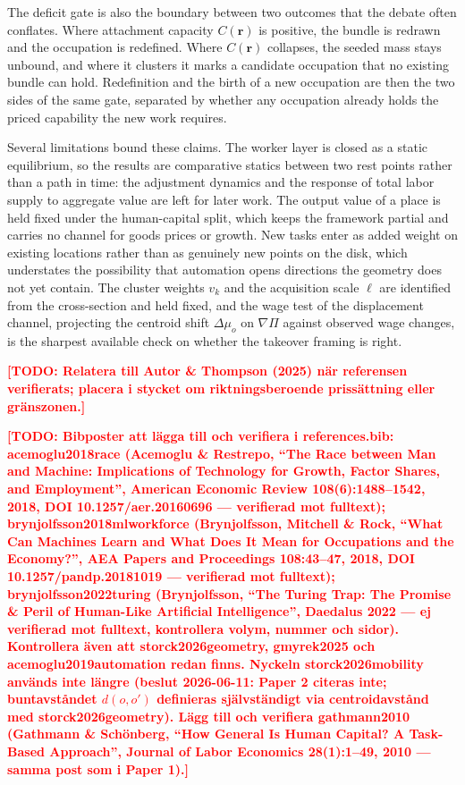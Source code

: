 \documentclass[12pt, a4paper]{article}
\newcommand{\todo}[1]{\textcolor{red}{\textbf{[TODO: #1]}}}
\begin{document}
The deficit gate is also the boundary between two outcomes that the
debate often conflates. Where attachment capacity $C(\mathbf{r})$ is
positive, the bundle is redrawn and the occupation is redefined. Where
$C(\mathbf{r})$ collapses, the seeded mass stays unbound, and where it
clusters it marks a candidate occupation that no existing bundle can
hold. Redefinition and the birth of a new occupation are then the two
sides of the same gate, separated by whether any occupation already
holds the priced capability the new work requires.

Several limitations bound these claims. The worker layer is closed as a
static equilibrium, so the results are comparative statics between two
rest points rather than a path in time: the adjustment dynamics and the
response of total labor supply to aggregate value are left for later
work. The output value of a place is held fixed under the
human-capital split, which keeps the framework partial and carries no
channel for goods prices or growth. New tasks enter as added weight on
existing locations rather than as genuinely new points on the disk,
which understates the possibility that automation opens directions the
geometry does not yet contain. The cluster weights $v_k$ and the
acquisition scale $\ell$ are identified from the cross-section and held
fixed, and the wage test of the displacement channel, projecting the
centroid shift $\Delta\mu_o$ on $\nabla\Pi$ against observed wage
changes, is the sharpest available check on whether the takeover
framing is right.

\todo{Relatera till Autor \& Thompson (2025) när referensen
verifierats; placera i stycket om riktningsberoende prissättning eller
gränszonen.}

\printbibliography

\todo{Bibposter att lägga till och verifiera i references.bib:
acemoglu2018race (Acemoglu \& Restrepo, ``The Race between Man and
Machine: Implications of Technology for Growth, Factor Shares, and
Employment'', American Economic Review 108(6):1488--1542, 2018,
DOI 10.1257/aer.20160696 --- verifierad mot fulltext);
brynjolfsson2018mlworkforce (Brynjolfsson, Mitchell \& Rock, ``What Can
Machines Learn and What Does It Mean for Occupations and the Economy?'',
AEA Papers and Proceedings 108:43--47, 2018, DOI 10.1257/pandp.20181019
--- verifierad mot fulltext); brynjolfsson2022turing (Brynjolfsson,
``The Turing Trap: The Promise \& Peril of Human-Like Artificial
Intelligence'', Daedalus 2022 --- ej verifierad mot fulltext, kontrollera
volym, nummer och sidor). Kontrollera även att storck2026geometry,
gmyrek2025 och acemoglu2019automation redan finns. Nyckeln
storck2026mobility används inte längre (beslut 2026-06-11: Paper 2
citeras inte; buntavståndet $d(o,o')$ definieras självständigt via
centroidavstånd med storck2026geometry). Lägg till och verifiera
gathmann2010 (Gathmann \& Schönberg, ``How General Is Human Capital?
A Task-Based Approach'', Journal of Labor Economics 28(1):1--49, 2010
--- samma post som i Paper 1).}
\end{document}
